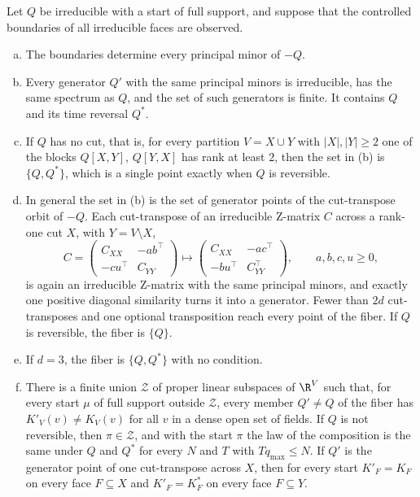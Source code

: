 \begin{theorem}\label{thm:nonreversible}
Let $Q$ be irreducible with a start of full support, and suppose that the
controlled boundaries of all irreducible faces are observed.
\begin{enumerate}[(a)]
\item The boundaries determine every principal minor of $-Q$.
\item Every generator $Q'$ with the same principal minors is irreducible, has
the same spectrum as $Q$, and the set of such generators is finite. It
contains $Q$ and its time reversal $Q^*$.
\item If $Q$ has no cut, that is, for every partition $V=X\cup Y$ with
$|X|,|Y|\ge2$ one of the blocks $Q[X,Y]$, $Q[Y,X]$ has rank at least $2$, then
the set in (b) is $\{Q,Q^*\}$, which is a single point exactly when $Q$ is
reversible.
\item In general the set in (b) is the set of generator points of the
cut-transpose orbit of $-Q$. Each cut-transpose of an irreducible Z-matrix $C$
across a rank-one cut $X$, with $Y=V\setminus X$,
\[
 C=\begin{pmatrix}C_{XX}&-ab^\top\\-cu^\top&C_{YY}\end{pmatrix}\mapsto
 \begin{pmatrix}C_{XX}&-ac^\top\\-bu^\top&C_{YY}^\top\end{pmatrix},\qquad a,b,c,u\ge0,
\]
is again an irreducible Z-matrix with the same principal minors, and exactly
one positive diagonal similarity turns it into a generator. Fewer than $2d$
cut-transposes and one optional transposition reach every point of the fiber.
If $Q$ is reversible, the fiber is $\{Q\}$.
\item If $d=3$, the fiber is $\{Q,Q^*\}$ with no condition.
\item There is a finite union $\mathcal Z$ of proper linear subspaces of $\R^V$
such that, for every start $\mu$ of full support outside $\mathcal Z$, every
member $Q'\ne Q$ of the fiber has $K'_V(v)\ne K_V(v)$ for all $v$ in a dense open
set of fields. If $Q$ is not reversible, then $\pi\in\mathcal Z$, and with the
start $\pi$ the law of the composition is the same under $Q$ and $Q^*$ for every
$N$ and $T$ with $Tq_{\max}\le N$. If $Q'$ is the generator point of one
cut-transpose across $X$, then
for every start $K'_F=K_F$ on every face $F\subseteq X$ and $K'_F=K^*_F$ on every
face $F\subseteq Y$.
\end{enumerate}
\end{theorem}

